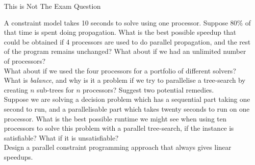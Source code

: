 \documentclass{beamer}
\begin{document}
\begin{frame}{This is Not The Exam Question}

    \scriptsize

    A constraint model takes 10 seconds to solve using one processor. Suppose 80\% of that time is
    spent doing propagation. What is the best possible speedup that could be obtained if 4
    processors are used to do parallel propagation, and the rest of the program remains
    unchanged? What about if we had an unlimited number of processors?
    \\[0.5cm]

    What about if we used the four processors for a portfolio of different solvers? \\[0.5cm]

    What is \emph{balance}, and why is it a problem if we try to parallelise a tree-search by
    creating $n$ sub-trees for $n$ processors? Suggest two potential remedies. \\[0.5cm]

    Suppose we are solving a decision problem which has a sequential part taking
    one second to run, and a parallelisable part which takes twenty seconds to run on one
    processor. What is the best possible runtime we might see when using ten processors to
    solve this problem with a parallel tree-search, if the instance is satisfiable? What if
    it is unsatisfiable? \\[0.5cm]

    Design a parallel constraint programming approach that always gives linear speedups.

\end{frame}

\end{document}
